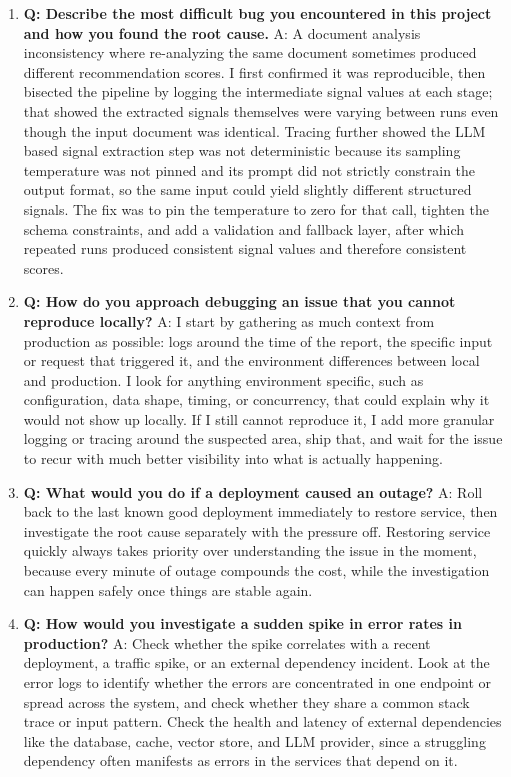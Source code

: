 \documentclass[11pt,a4paper]{report}
\begin{document}
\begin{enumerate}[leftmargin=*]
\item \textbf{Q: Describe the most difficult bug you encountered in this project and how you found the root cause.}
A: A document analysis inconsistency where re-analyzing the same document sometimes produced different recommendation scores. I first confirmed it was reproducible, then bisected the pipeline by logging the intermediate signal values at each stage; that showed the extracted signals themselves were varying between runs even though the input document was identical. Tracing further showed the LLM based signal extraction step was not deterministic because its sampling temperature was not pinned and its prompt did not strictly constrain the output format, so the same input could yield slightly different structured signals. The fix was to pin the temperature to zero for that call, tighten the schema constraints, and add a validation and fallback layer, after which repeated runs produced consistent signal values and therefore consistent scores.

\item \textbf{Q: How do you approach debugging an issue that you cannot reproduce locally?}
A: I start by gathering as much context from production as possible: logs around the time of the report, the specific input or request that triggered it, and the environment differences between local and production. I look for anything environment specific, such as configuration, data shape, timing, or concurrency, that could explain why it would not show up locally. If I still cannot reproduce it, I add more granular logging or tracing around the suspected area, ship that, and wait for the issue to recur with much better visibility into what is actually happening.

\item \textbf{Q: What would you do if a deployment caused an outage?}
A: Roll back to the last known good deployment immediately to restore service, then investigate the root cause separately with the pressure off. Restoring service quickly always takes priority over understanding the issue in the moment, because every minute of outage compounds the cost, while the investigation can happen safely once things are stable again.

\item \textbf{Q: How would you investigate a sudden spike in error rates in production?}
A: Check whether the spike correlates with a recent deployment, a traffic spike, or an external dependency incident. Look at the error logs to identify whether the errors are concentrated in one endpoint or spread across the system, and check whether they share a common stack trace or input pattern. Check the health and latency of external dependencies like the database, cache, vector store, and LLM provider, since a struggling dependency often manifests as errors in the services that depend on it.


\end{enumerate}
\end{document}
